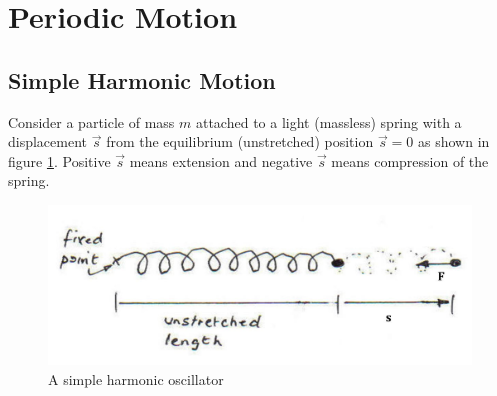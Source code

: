 \section{Periodic Motion}

\subsection{Simple Harmonic Motion}

Consider a particle of mass $m$ attached to a light (massless) spring with a displacement $\vec{s}$ from the equilibrium (unstretched) position $\vec{s} = 0$ as shown in figure \ref{fig:sho}. Positive $\vec{s}$ means extension and negative $\vec{s}$ means compression of the spring. 
\begin{figure}[h!]
    \centering
    \includegraphics[scale=0.5]{notes/images/SHO.JPG}
    \caption{A simple harmonic oscillator}
    \label{fig:sho}
\end{figure}
\FloatBarrier

